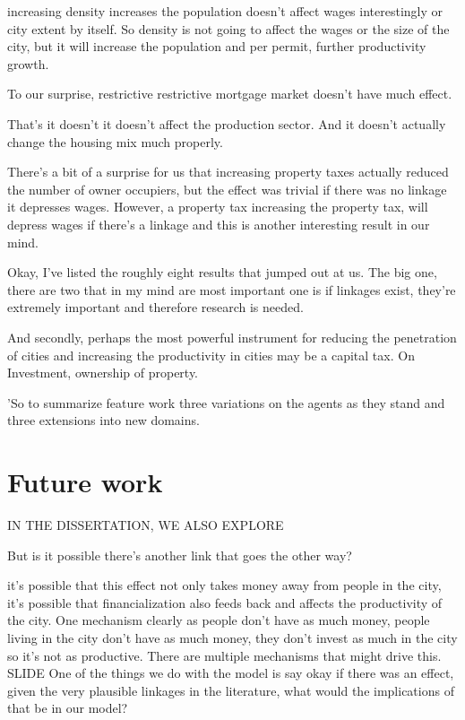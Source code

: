 \documentclass[]{article}
\begin{document}
increasing density increases the population doesn't affect wages interestingly or city extent by itself. So density is not going to affect the wages or the size of the city, but it will increase the population and per permit, further productivity growth.


To our surprise, restrictive restrictive mortgage market doesn't have much effect.

That's it doesn't it doesn't affect the production sector. And it doesn't actually change the housing mix much properly. 

There's a bit of a surprise for us that increasing property taxes actually reduced the number of owner occupiers, but the effect was trivial if there was no linkage it depresses wages. However, a property tax increasing the property tax, will depress wages if there's a linkage and this is another interesting result in our mind. 

Okay, I've listed the roughly eight results that jumped out at us. The big one, there are two that in my mind are most important one is if linkages exist, they're extremely important and therefore research is needed.

And secondly, perhaps the most powerful instrument for reducing the penetration of cities and increasing the productivity in cities may be a capital tax. On Investment, ownership of property.

'So to summarize feature work three variations on the agents as they stand and three extensions into new domains. 

\section{Future work}


IN THE DISSERTATION, WE ALSO EXPLORE

But is it possible there's another link that goes the other way?

it's  possible that this effect not only takes money away from people in the city, it's possible that financialization also feeds back and  affects the productivity of the city. One mechanism clearly as people don't have as much money, people living in the city don't have as much money, they don't invest as much in the city so it's not as productive. 
There are multiple mechanisms that might drive this. SLIDE
One of the things we do with the model is say okay if there was an effect, given the very plausible linkages in the literature, what would the implications of that be in our model?
\end{document}
